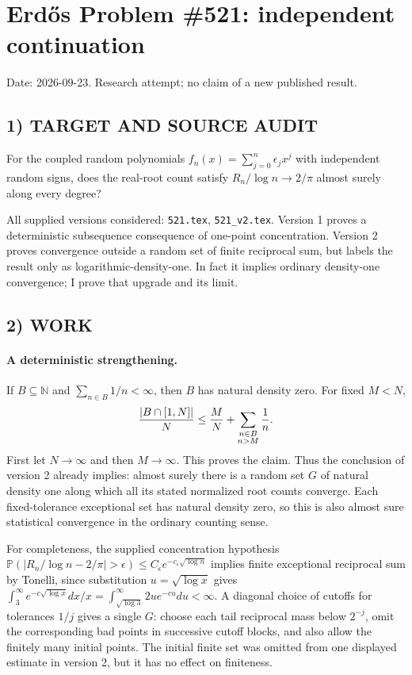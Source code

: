 \section{Erd\H{o}s Problem \#521: independent continuation}
\noindent Date: 2026-09-23. Research attempt; no claim of a new published result.
\subsection{1) TARGET AND SOURCE AUDIT}
For the coupled random polynomials $f_n(x)=\sum_{j=0}^n\epsilon_jx^j$ with independent random signs, does the real-root count satisfy $R_n/\log n\to2/\pi$ almost surely along every degree?

All supplied versions considered: \texttt{521.tex}, \texttt{521\_v2.tex}.
Version 1 proves a deterministic subsequence consequence of one-point concentration. Version 2 proves convergence outside a random set of finite reciprocal sum, but labels the result only as logarithmic-density-one. In fact it implies ordinary density-one convergence; I prove that upgrade and its limit.
\subsection{2) WORK}
\paragraph{A deterministic strengthening.}
If $B\subseteq\mathbb N$ and $\sum_{n\in B}1/n<\infty$, then $B$ has natural density zero. For fixed $M<N$,
\[
{|B\cap[1,N]|\over N}\le {M\over N}+\sum_{\substack{n\in B\\n>M}}{1\over n}.
\]
First let $N\to\infty$ and then $M\to\infty$. This proves the claim.
Thus the conclusion of version 2 already implies: almost surely there is a random set $G$ of natural density one along which all its stated normalized root counts converge. Each fixed-tolerance exceptional set has natural density zero, so this is also almost sure statistical convergence in the ordinary counting sense.

For completeness, the supplied concentration hypothesis
$\mathbb P(|R_n/\log n-2/\pi|>\epsilon)\le C_\epsilon e^{-c_\epsilon\sqrt{\log n}}$
implies finite exceptional reciprocal sum by Tonelli, since substitution $u=\sqrt{\log x}$ gives
$\int_3^\infty e^{-c\sqrt{\log x}}dx/x=\int_{\sqrt{\log3}}^\infty2ue^{-cu}du<\infty$.
A diagonal choice of cutoffs for tolerances $1/j$ gives a single $G$: choose each tail reciprocal mass below $2^{-j}$, omit the corresponding bad points in successive cutoff blocks, and also allow the finitely many initial points. The initial finite set was omitted from one displayed estimate in version 2, but it has no effect on finiteness.

